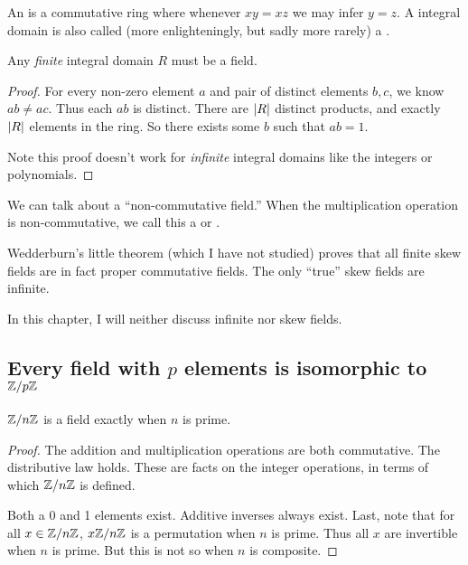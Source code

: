 \begin{definition}
  An  is a commutative ring where whenever $xy =
  xz$ we may infer $y = z$. A integral domain is also called (more
  enlighteningly, but sadly more rarely) a .
\end{definition}

\begin{proposition}
  Any \emph{finite} integral domain $R$ must be a field.
\end{proposition}

\begin{proof}
  For every non-zero element $a$ and pair of distinct elements $b, c$,
  we know $ab \ne ac$. Thus each $ab$ is distinct. There are $|R|$
  distinct products, and exactly $|R|$ elements in the ring. So
  there exists some $b$ such that $ab = 1$.

  Note this proof doesn't work for \emph{infinite} integral domains like
  the integers or polynomials.
\end{proof}

\begin{definition}
  We can talk about a ``non-commutative field.'' When the multiplication
  operation is non-commutative, we call this a  or
  .
\end{definition}

\begin{remark}
  Wedderburn's little theorem (which I have not studied) proves that all
  finite skew fields are in fact proper commutative fields. The only
  ``true'' skew fields are infinite.

  In this chapter, I will neither discuss infinite nor skew fields.
\end{remark}

\subsection{Every field with $p$ elements is isomorphic to $\mathbb{Z} / p\mathbb{Z}$}

\begin{theorem}
  $\mathbb{Z} / n\mathbb{Z}$ is a field exactly when $n$ is prime.
\end{theorem}

\begin{proof}
  The addition and multiplication operations are both commutative. The
  distributive law holds. These are facts on the integer operations, in
  terms of which $\mathbb{Z} / n\mathbb{Z}$ is defined.

  Both a 0 and 1 elements exist. Additive inverses always exist. Last,
  note that for all $x \in \mathbb{Z} / n\mathbb{Z}$, $x\mathbb{Z} / n\mathbb{Z}$ is a permutation when $n$
  is prime. Thus all $x$ are invertible when $n$ is prime. But this is
  not so when $n$ is composite.
\end{proof}

